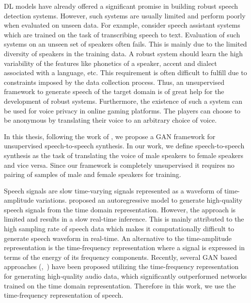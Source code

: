 DL models have already offered a significant promise in building robust speech detection systems. However, such systems are usually limited and perform poorly when evaluated on unseen data. For example, consider speech assistant systems which are trained on the task of transcribing speech to text.
Evaluation of such systems on an unseen set of speakers often fails. This is mainly due to the limited diversity of speakers in the training data. A robust system should learn the high variability of the features like phonetics of a speaker, accent and dialect associated with a language, etc. This requirement is often difficult to fulfill due to constraints imposed by the data collection process. Thus, an unsupervised framework to generate speech of the target domain is of great help for the development of robust systems. Furthermore, the existence of such a system can be used for voice privacy in online gaming platforms. The players can choose to be anonymous by translating their voice to an arbitrary choice of voice. 

In this thesis, following the work of \citet{liu2017unsupervised}, we propose a GAN framework for unsupervised speech-to-speech synthesis. In our work, we define speech-to-speech synthesis as the task of translating the voice of male speakers to female speakers and vice versa. Since our framework is completely unsupervised it requires no pairing of samples of male and female speakers for training.

Speech signals are slow time-varying signals represented as a waveform of time-amplitude variations. \citet{oord2016wavenet} proposed an autoregressive model to generate high-quality speech signals from the time domain representation. However, the approach is limited and results in a slow real-time inference. This is mainly attributed to the high sampling rate of speech data which makes it computationally difficult to generate speech waveform in real-time. An alternative to the time-amplitude representation is the time-frequency representation where a signal is expressed in terms of the energy of its frequency components. Recently, several GAN based approaches (\cite{engel2019gansynth},~\cite{marafiotiadversarial}) have been proposed utilizing the time-frequency representation for generating high-quality audio data, which significantly outperformed networks trained on the time domain representation. Therefore in this work, we use the time-frequency representation of speech.

